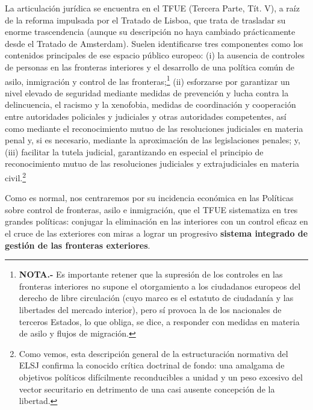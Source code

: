 \documentclass[10pt,a4paper]{article}
\begin{document}
La articulación jurídica se encuentra en el TFUE (Tercera Parte, Tít. V), a raíz de la reforma impulsada por el Tratado de Lisboa, que trata de trasladar su enorme trascendencia (aunque su descripción no haya cambiado prácticamente desde el Tratado de Amsterdam). Suelen identificarse tres componentes como los contenidos principales de ese espacio público europeo: (i) la ausencia de controles de personas en las fronteras interiores y el desarrollo de una política común de asilo, inmigración y control de las fronteras;\footnote{%
    \textbf{NOTA.-} Es importante retener que la supresión de los controles en las fronteras interiores no supone el otorgamiento a los ciudadanos europeos del derecho de libre circulación (cuyo marco es el estatuto de ciudadanía y las libertades del mercado interior), pero sí provoca la de los nacionales de terceros Estados, lo que obliga, se dice, a responder con medidas en materia de asilo y flujos de migración.
} (ii) esforzarse por garantizar un nivel elevado de seguridad mediante medidas de prevención y lucha contra la delincuencia, el racismo y la xenofobia, medidas de coordinación y cooperación entre autoridades policiales y judiciales y otras autoridades competentes, así como mediante el reconocimiento mutuo de las resoluciones judiciales en materia penal y, si es necesario, mediante la aproximación de las legislaciones penales; y, (iii) facilitar la tutela judicial, garantizando en especial el principio de reconocimiento mutuo de las resoluciones judiciales y extrajudiciales en materia civil.\footnote{%
    Como vemos, esta descripción general de la estructuración normativa del ELSJ confirma la conocido crítica doctrinal de fondo: una amalgama de objetivos políticos difícilmente reconducibles a unidad y un peso excesivo del vector securitario en detrimento de una casi ausente concepción de la libertad.
}

Como es normal, nos centraremos por su incidencia económica en las Políticas sobre control de fronteras, asilo e inmigración, que el TFUE sistematiza en tres grandes políticas: conjugar la eliminación en las interiores con un control eficaz en el cruce de las exteriores con miras a lograr un progresivo \textbf{sistema integrado de gestión de las fronteras exteriores}. 
\end{document}
